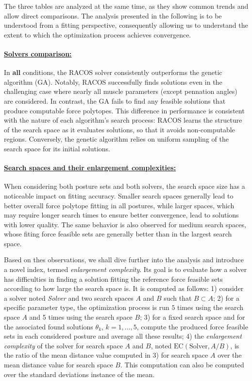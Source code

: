 The three tables are analyzed at the same time, as they show common trends and allow direct comparisons. The analysis presented in the following is to be understood from a fitting perspective, consequently allowing us to understand the extent to which the optimization process achieves convergence.

\paragraph*{\underline{Solvers comparison:}}
In \textbf{all} conditions, the RACOS solver consistently outperforms the genetic algorithm (GA). Notably, RACOS successfully finds solutions even in the challenging case where nearly all muscle parameters (except pennation angles) are considered. In contrast, the GA fails to find any feasible solutions that produce computable force polytopes. This difference in performance is consistent with the nature of each algorithm's search process: RACOS learns the structure of the search space as it evaluates solutions, so that it avoids non-computable regions. Conversely, the genetic algorithm relies on uniform sampling of the search space for its initial solutions.

\paragraph*{\underline{Search spaces and their enlargement complexities:}}
\label{par:enlargement_complexity_pol}
When considering both posture sets and both solvers, the search space size has a noticeable impact on fitting accuracy. Smaller search spaces generally lead to better overall force polytope fitting in all postures, while larger spaces, which may require longer search times to ensure better convergence, lead to solutions with lower quality. The same behavior is also observed for medium search spaces, whose fiting force feasible sets are generally better than in the largest search space.

Based on thes observations, we shall dive further into the analysis and introduce a novel index, termed \emph{enlargement complexity}. Its goal is to evaluate how a solver has difficulties in finding a solution fitting the reference force feasible sets according to how large the search space is. It is computed as follows: 1) consider a solver noted \emph{Solver} and two search spaces $A$ and $B$ such that $B\subset A$; 2) for a specific parameter type, the optimization process is run $5$ times using the search space $A$ and 5 times using the search space $B$; 3) for a fixed search space and for the associated found solutions $\theta_k$, $k=1,\dots, 5$, compute the produced force feasible sets in each considered posture and average all these results; 4) the \emph{enlargement complexity} of the solver for search space $A$ and $B$, noted $\text{EC}(\text{Solver}, A/B)$, is the ratio of the mean distance value computed in 3) for search space $A$ over the mean distance value for search space $B$. This computation can also be computed over the standard deviations instance of the mean. 

